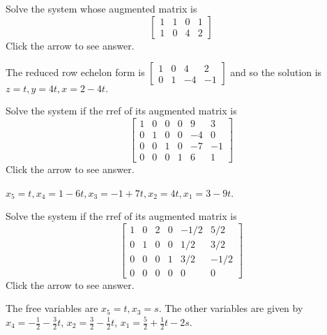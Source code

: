 \documentclass{ximera}
\begin{document}
\begin{problem}\label{prb:2.27} Solve the system whose augmented matrix is
\begin{equation*}
\left[
\begin{array}{rrr|r}
1 & 1 & 0 & 1 \\
1 & 0 & 4 & 2
\end{array}
\right]
\end{equation*}
Click the arrow to see answer. 
\begin{expandable}{}{}
The reduced row echelon form is $\left[
\begin{array}{rrr|r}
1 & 0 & 4 & 2 \\
0 & 1 & -4 & -1
\end{array}
\right] $ and so the solution is $z=t,y=4t,x=2-4t.$
\end{expandable}
\end{problem}

\begin{problem}\label{prb:2.28} Solve the system if the rref of its augmented matrix is
$$\left[
\begin{array}{rrrrr|r}
1 & 0 & 0 & 0 & 9 & 3 \\
0 & 1 & 0 & 0 & -4 & 0 \\
0 & 0 & 1 & 0 & -7 & -1 \\
0 & 0 & 0 & 1 & 6 & 1
\end{array}
\right] $$
Click the arrow to see answer. 
\begin{expandable}{}{}
$x_{5}=t,x_{4}=1-6t,x_{3}=-1+7t,x_{2}=4t,x_{1}=3-9t$.
\end{expandable}
\end{problem}

\begin{problem}\label{prb:2.29} Solve the system if the rref of its augmented matrix is
$$\left[
\begin{array}{rrrrr|r}
1 & 0 & 2 & 0 & -1/2 &  5/2 \\
0 & 1 & 0 & 0 &  1/2 &  3/2 \\
0 & 0 & 0 & 1 &  3/2 & -1/2 \\
0 & 0 & 0 & 0 & 0 & 0
\end{array}
\right] $$
Click the arrow to see answer. 
\begin{expandable}{}{}
The free variables are $x_{5}=t,x_{3}=s$. The other variables are
given by $x_{4}=-\frac{1}{2}-\frac{3}{2}t$, $x_{2}=\frac{3}{2}-\frac{1}{2}t$, $x_{1}=\frac{5}{2}+\frac{1}{2}t-2s$.
\end{expandable}
\end{problem}
\end{document}
